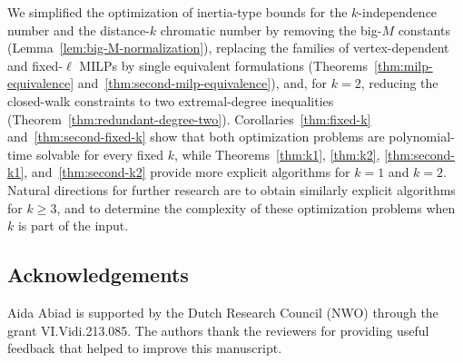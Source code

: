 \documentclass[10pt]{article}
\begin{document}
We simplified the optimization of inertia-type bounds for the
\(k\)-independence number and the distance-\(k\) chromatic number by removing
the big-\(M\) constants (Lemma~\ref{lem:big-M-normalization}), replacing the
families of vertex-dependent and fixed-\(\ell\) MILPs by single equivalent
formulations (Theorems~\ref{thm:milp-equivalence}
and~\ref{thm:second-milp-equivalence}), and, for \(k=2\), reducing the
closed-walk constraints to two extremal-degree inequalities
(Theorem~\ref{thm:redundant-degree-two}). Corollaries~\ref{thm:fixed-k}
and~\ref{thm:second-fixed-k} show that both optimization problems are
polynomial-time solvable for every fixed \(k\), while
Theorems~\ref{thm:k1}, \ref{thm:k2}, \ref{thm:second-k1},
and~\ref{thm:second-k2} provide more explicit algorithms for \(k=1\) and
\(k=2\). Natural directions for further research are to obtain similarly
explicit algorithms for \(k\geq3\), and to determine the complexity of these
optimization problems when \(k\) is part of the input.

\subsection*{Acknowledgements}
Aida Abiad is supported by the Dutch Research Council (NWO) through the grant VI.Vidi.213.085. The authors thank the reviewers for providing useful feedback that helped to improve this manuscript.




\end{document}
